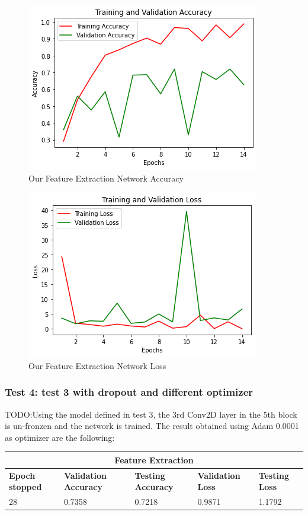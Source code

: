 \medskip

\begin{figure}[H]
	\centering
	\includegraphics[height=0.45\textwidth]{img/vgg16ft1acc.png}
	\caption{Our Feature Extraction Network Accuracy}
	\label{fig:vgg16ft1acc}
\end{figure}

\begin{figure}[H]
	\centering
	\includegraphics[height=0.45\textwidth]{img/vgg16ft1loss.png}
	\caption{Our Feature Extraction Network Loss}
	\label{fig:vgg16ft1loss}
\end{figure}










\subsubsection{Test 4: test 3 with dropout and different optimizer}
TODO:Using the model defined in test 3, the 3rd Conv2D layer in the 5th block is un-fronzen and the network is trained. The result obtained using Adam 0.0001 as optimizer are the following:

 
 \medskip

\begin{tabular}{ |p{2cm}|p{2cm}|p{2cm}|p{2cm}|p{2cm}|  }
\hline
\multicolumn{5}{|c|}{Feature Extraction} \\
\hline
\textbf{Epoch stopped} & \textbf{Validation Accuracy} & \textbf{Testing Accuracy} & \textbf{Validation Loss} & \textbf{Testing Loss} \\
\hline
28 & 0.7358 & 0.7218 & 0.9871 & 1.1792\\
\hline
\end{tabular}

